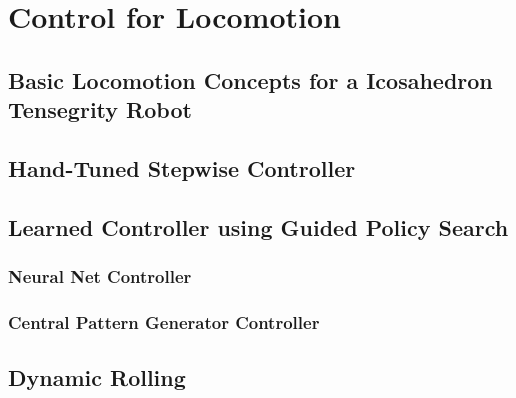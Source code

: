 {\color{red}
\chapter{Control for \SB{} Locomotion}
\label{controls}

\section{Basic Locomotion Concepts for a Icosahedron Tensegrity Robot}
\label{basic_locomotion}

\section{Hand-Tuned Stepwise Controller}
\label{hand_stepwise}

\section{Learned Controller using Guided Policy Search}
\label{learned_controllers}

\subsection{Neural Net Controller}
\label{nn_controller}

\subsection{Central Pattern Generator Controller}
\label{cpg_controller}

\section{Dynamic Rolling}
\label{dyncamic_rolling}
}